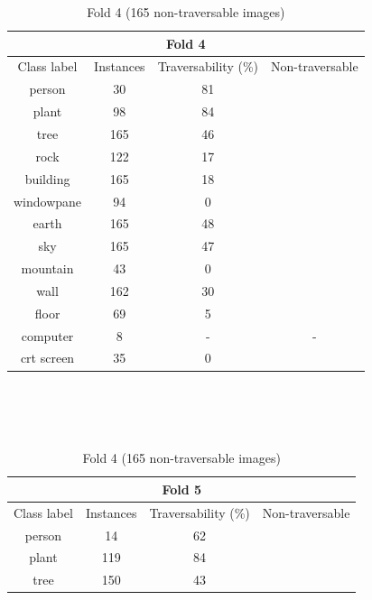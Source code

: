 \documentclass[12pt,a4paper,table,dvipsnames,tikz]{report}
\begin{document}
	\begin{table}[h!]
		\ContinuedFloat %
		\begin{subtable}[h!]{\textwidth}
			\centering
			\begin{tabular}{|c|c|c|c|}
				\hline
				\multicolumn{4}{|c|}{Fold 4}\\
				\hline
				Class label & Instances & Traversability (\%) & Non-traversable\\
				\hline\hline
				person & 30 & 81 &\\
				\hline
				plant & 98 & 84 &\\
				\hline
				\rowcolor{tree}
				tree & 165 & 46 & \checkmark\\
				\hline
				rock & 122 & 17 & \checkmark\\
				\hline
				building & 165 & 18 & \checkmark\\
				\hline
				windowpane & 94 & 0 & \checkmark\\
				\hline
				\rowcolor{earth}
				earth & 165 & 48 & \checkmark\\
				\hline
				\rowcolor{sky}
				sky & 165 & 47 & \checkmark\\
				\hline
				mountain & 43 & 0 & \checkmark\\
				\hline
				wall & 162 & 30 & \checkmark\\
				\hline
				floor & 69 & 5 & \checkmark\\
				\hline
				computer & 8 & - & -\\
				\hline
				crt screen & 35 & 0 & \checkmark\\
				\hline
			\end{tabular}
			\caption{Fold 4 (165 non-traversable images)}
			\label{table:obst.f4}
		\end{subtable}
		\\\\\\
		\begin{subtable}[h!]{\textwidth}
			\centering
			\begin{tabular}{|c|c|c|c|}
				\hline
				\multicolumn{4}{|c|}{Fold 5}\\
				\hline
				Class label & Instances & Traversability (\%) & Non-traversable\\
				\hline\hline
				person & 14 & 62 &\\
				\hline
				plant & 119 & 84 &\\
				\hline
				\rowcolor{tree}
				tree & 150 & 43 & \checkmark\\
				\hline

\end{tabular}
\end{subtable}
\end{table}
\end{document}
